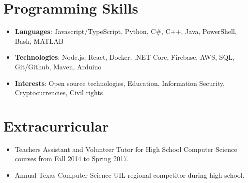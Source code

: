 \documentclass[letterpaper,11pt]{article}
\newcommand{\resumeItem}[2]{
  \item\small{
    \textbf{#1}{: #2 \vspace{-2pt}}
  }
}
\newcommand{\resumeSubItem}[2]{\resumeItem{#1}{#2}\vspace{-4pt}}
\newcommand{\resumeSubHeadingListStart}{\begin{itemize}[leftmargin=*]}
\newcommand{\resumeSubHeadingListEnd}{\end{itemize}}
\begin{document}
%
\section{Programming Skills}
  \resumeSubHeadingListStart
    \resumeSubItem{Languages}{Javascript/TypeScript, Python, C\#, C++, Java, PowerShell, Bash, MATLAB}
    \resumeSubItem{Technologies}{Node.js, React, Docker, .NET Core, Firebase, AWS, SQL, Git/Github, Maven, Arduino}
    \resumeSubItem{Interests}{Open source technologies, Education, Information Security, Cryptocurrencies, Civil rights}
  \resumeSubHeadingListEnd

\section{Extracurricular}
  \resumeSubHeadingListStart
  	\item{Teachers Assistant and Volunteer Tutor for High School Computer Science courses from Fall 2014 to Spring 2017.}\vspace{-4pt}
    \item{Annual Texas Computer Science UIL regional competitor during high school.}\vspace{-4pt}
  \resumeSubHeadingListEnd


\end{document}

